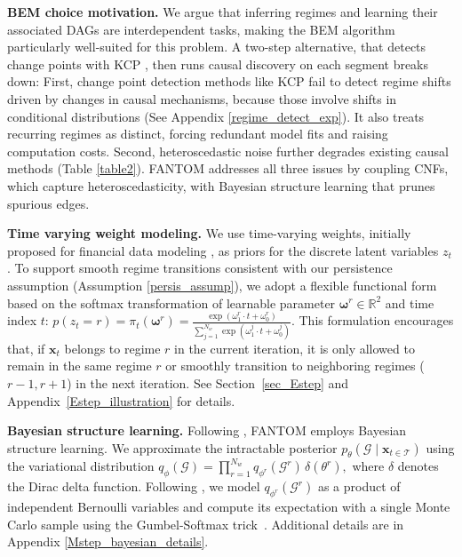 \textbf{BEM choice motivation. } We argue that inferring regimes and learning their associated DAGs are interdependent tasks, making the BEM algorithm particularly well-suited for this problem. A two-step alternative, that detects change points with KCP \citep{arlot2019kernel}, then runs causal discovery on each segment breaks down: First, change point detection methods like KCP \citep{arlot2019kernel} fail to detect regime shifts driven by changes in causal mechanisms, because those involve shifts in conditional distributions (See Appendix \ref{regime_detect_exp}). It also treats recurring regimes as distinct, forcing redundant model fits and raising computation costs. Second, heteroscedastic noise further degrades existing causal methods (Table \ref{table2}). FANTOM addresses all three issues by coupling CNFs, which capture heteroscedasticity, with Bayesian structure learning that prunes spurious edges.

\textbf{Time varying weight modeling. }We use time-varying weights, initially proposed for financial data modeling \citep{zhang2020time,wong2001logistic}, as priors for the discrete latent variables $z_t$. To support smooth regime transitions consistent with our persistence assumption (Assumption \ref{persis_assump}), we adopt a flexible functional form based on the softmax transformation of learnable parameter $\boldsymbol{\omega}^{r} \in \mathbb{R}^2$ and time index $t$:
$
   p\left(z_t = r\right) = \pi_t(\boldsymbol{\omega}^{r})=\frac{\exp \left(\omega^r_{1} \cdot t+\omega^r_{ 0}\right)}{\sum_{j=1}^{N_w} \exp \left(\omega^j_{1} \cdot t+\omega^j_{0}\right)}.
$
This formulation encourages that, if $\boldsymbol{x}_t$ belongs to regime $r$ in the current iteration, it is only allowed to remain in the same regime $r$ or smoothly transition to neighboring regimes ($r-1, r+1$) in the next iteration. See Section~\ref{sec_Estep} and Appendix~\ref{Estep_illustration} for details.

\textbf{Bayesian structure learning. }Following \citep{geffner2022deep, gong2022rhino, wang2023neural}, FANTOM employs Bayesian structure learning. We approximate the intractable posterior \(p_\theta(\mathcal{G} \mid \boldsymbol{x}_{t \in \mathcal{T}})\) using the variational distribution
$
q_\phi(\mathcal{G}) = \prod_{r=1}^{N_w} q_{\phi^r}(\mathcal{G}^r)\, \delta(\theta^r),
$
where \(\delta\) denotes the Dirac delta function. Following \citep{geffner2022deep, gong2022rhino, wang2023neural}, we model \(q_{\phi^r}(\mathcal{G}^r)\) as a product of independent Bernoulli variables and compute its expectation with a single Monte Carlo sample using the Gumbel-Softmax trick~\citep{jang2016categorical}. Additional details are in Appendix \ref{Mstep_bayesian_details}. 

